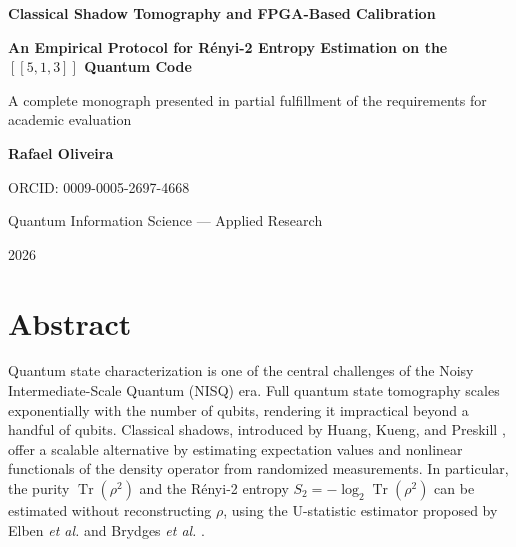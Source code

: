 \documentclass[12pt,a4paper,oneside]{book}
\theoremstyle{plain}
\theoremstyle{definition}
\theoremstyle{remark}
\begin{document}
\frontmatter

\begin{titlepage}
\centering
\vspace*{1.2cm}
{\LARGE\bfseries Classical Shadow Tomography and FPGA-Based Calibration\par}
\vspace{0.4cm}
{\LARGE\bfseries An Empirical Protocol for R\'enyi-2 Entropy Estimation on the $[[5,1,3]]$ Quantum Code\par}
\vspace{1.2cm}
{\large A complete monograph presented in partial fulfillment of the requirements for academic evaluation\par}
\vspace{2.0cm}
{\Large\textbf{Rafael Oliveira}\par}
\vspace{0.3cm}
{\large ORCID: 0009-0005-2697-4668\par}
\vspace{2.0cm}
{\large Quantum Information Science --- Applied Research\par}
\vspace{1.0cm}
{\large 2026\par}
\vfill
\end{titlepage}

\chapter*{Abstract}

Quantum state characterization is one of the central challenges of the Noisy Intermediate-Scale Quantum (NISQ) era. Full quantum state tomography scales exponentially with the number of qubits, rendering it impractical beyond a handful of qubits. Classical shadows, introduced by Huang, Kueng, and Preskill \cite{huang2020predicting}, offer a scalable alternative by estimating expectation values and nonlinear functionals of the density operator from randomized measurements. In particular, the purity $\operatorname{Tr}(\rho^2)$ and the R\'enyi-2 entropy $S_2 = -\log_2 \operatorname{Tr}(\rho^2)$ can be estimated without reconstructing $\rho$, using the U-statistic estimator proposed by Elben \textit{et al.} \cite{elben2020cross} and Brydges \textit{et al.} \cite{brydges2019probing}.
\end{document}
